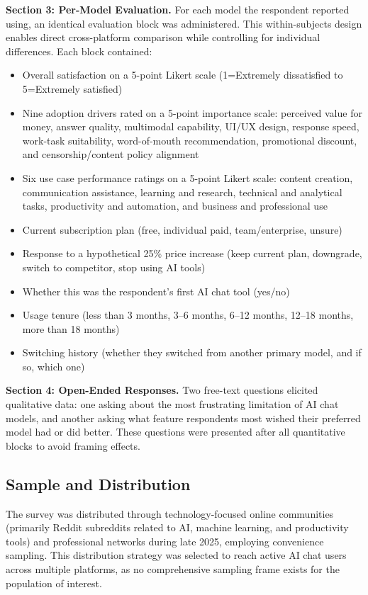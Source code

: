 \documentclass[10pt,twocolumn]{article}
\begin{document}
\textbf{Section 3: Per-Model Evaluation.} For each model the respondent reported using, an identical evaluation block was administered. This within-subjects design enables direct cross-platform comparison while controlling for individual differences. Each block contained:

\begin{itemize}
\item Overall satisfaction on a 5-point Likert scale (1=Extremely dissatisfied to 5=Extremely satisfied)
\item Nine adoption drivers rated on a 5-point importance scale: perceived value for money, answer quality, multimodal capability, UI/UX design, response speed, work-task suitability, word-of-mouth recommendation, promotional discount, and censorship/content policy alignment
\item Six use case performance ratings on a 5-point Likert scale: content creation, communication assistance, learning and research, technical and analytical tasks, productivity and automation, and business and professional use
\item Current subscription plan (free, individual paid, team/enterprise, unsure)
\item Response to a hypothetical 25\% price increase (keep current plan, downgrade, switch to competitor, stop using AI tools)
\item Whether this was the respondent's first AI chat tool (yes/no)
\item Usage tenure (less than 3 months, 3--6 months, 6--12 months, 12--18 months, more than 18 months)
\item Switching history (whether they switched from another primary model, and if so, which one)
\end{itemize}

\textbf{Section 4: Open-Ended Responses.} Two free-text questions elicited qualitative data: one asking about the most frustrating limitation of AI chat models, and another asking what feature respondents most wished their preferred model had or did better. These questions were presented after all quantitative blocks to avoid framing effects.

\subsection{Sample and Distribution}

The survey was distributed through technology-focused online communities (primarily Reddit subreddits related to AI, machine learning, and productivity tools) and professional networks during late 2025, employing convenience sampling. This distribution strategy was selected to reach active AI chat users across multiple platforms, as no comprehensive sampling frame exists for the population of interest.
\end{document}
